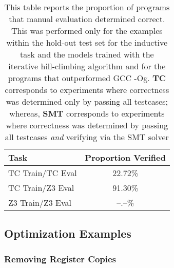 \documentclass{article}
\begin{document}
\begin{table}[t]
\caption{This table reports the proportion of programs that manual evaluation determined correct. This was performed only for the examples within the hold-out test set for the inductive task and the models trained with the iterative hill-climbing algorithm and for the programs that outperformed GCC -Og.  \textbf{TC} corresponds to experiments where correctness was determined only by passing all testcases; whereas, \textbf{SMT} corresponds to experiments where correctness was determined by passing all testcases \textit{and} verifying via the SMT solver}
\label{tab:manual}
\vskip 0.15in
\begin{center}
\begin{small}
\begin{sc}
\begin{tabular}{lc}
\toprule
Task & Proportion Verified \\
\midrule
TC Train/TC Eval  & 22.72\%\\
TC Train/Z3 Eval   & 91.30\%\\
Z3 Train/Z3 Eval  & --.--\%\\
\bottomrule
\end{tabular}
\end{sc}
\end{small}
\end{center}
\vskip -0.1in
\end{table}

\subsection{Optimization Examples}

\subsubsection{Removing Register Copies}
\end{document}
